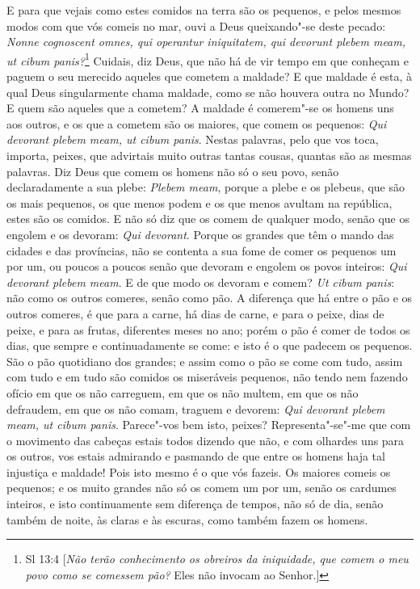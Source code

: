 E para que vejais como estes comidos na terra são os pequenos, e pelos
mesmos modos com que vós comeis no mar, ouvi a Deus queixando"-se deste
pecado: \emph{Nonne cognoscent omnes, qui operantur iniquitatem, qui
devorunt plebem meam, ut cibum panis?}\footnote{Sl 13:4 [\emph{Não terão conhecimento os obreiros da iniquidade, que comem o meu povo como se comessem pão?} Eles não invocam ao Senhor.]} Cuidais, diz Deus, que não há de
vir tempo em que
conheçam e paguem o seu merecido aqueles que cometem a maldade? E que
maldade é esta, à qual Deus singularmente chama maldade, como se não
houvera outra no Mundo? E quem são aqueles que a cometem? A maldade é
comerem"-se os homens uns aos outros, e os que a cometem são os maiores,
que comem os pequenos: \emph{Qui devorant plebem meam, ut cibum panis}.
Nestas palavras, pelo que vos toca, importa, peixes, que advirtais muito
outras tantas cousas, quantas são as mesmas palavras. Diz Deus que comem
os homens não só o seu povo, senão declaradamente a sua plebe:
\emph{Plebem meam}, porque a plebe e os plebeus, que são os mais
pequenos, os que menos podem e os que menos avultam na república, estes
são os comidos. E não só diz que os comem de qualquer modo, senão que os
engolem e os devoram: \emph{Qui devorant}. Porque os grandes que têm o
mando das cidades e das províncias, não se contenta a sua fome de comer
os pequenos um por um, ou poucos a poucos senão que devoram e engolem os
povos inteiros: \emph{Qui devorant plebem meam}. E de que modo os
devoram e comem? \emph{Ut cibum panis}: não como os outros comeres,
senão como pão.
A diferença que há entre o pão e os outros comeres, é que para a carne,
há dias de carne, e para o peixe, dias de peixe, e para as frutas,
diferentes meses no ano; porém o pão é comer de todos os dias, que
sempre e continuadamente se come: e isto é o que padecem os pequenos.
São o pão quotidiano dos grandes; e assim como o pão se come com tudo,
assim com tudo e em tudo são comidos os miseráveis pequenos, não tendo
nem fazendo ofício em que os não carreguem, em que os não multem, em que
os não defraudem, em que os não comam, traguem e devorem: \emph{Qui
devorant plebem meam, ut cibum panis}.
Parece"-vos bem isto, peixes? Representa"-se"-me que com o movimento das
cabeças estais todos dizendo que não, e com olhardes uns para os outros,
vos estais admirando e pasmando de que entre os homens haja tal
injustiça e maldade! Pois isto mesmo é o que vós fazeis. Os maiores
comeis os pequenos; e os muito grandes não só os comem um por um, senão
os cardumes inteiros, e isto continuamente sem diferença de tempos, não
só de dia, senão também de noite, às claras e às escuras, como também
fazem os homens.

